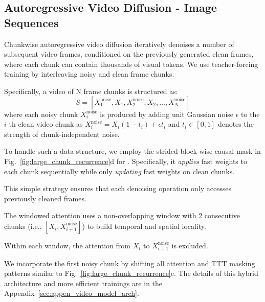 \documentclass{article}
\begin{document}
\subsection{Autoregressive Video Diffusion - Image Sequences}

\label{sec:method-arvideo}

Chunkwise autoregressive video diffusion iteratively denoises a number of subsequent video frames, conditioned on the previously generated clean frames, where each chunk can contain thousands of visual tokens. 
We use teacher-forcing training by interleaving noisy and clean frame chunks.

Specifically, a video of N frame chunks is structured as:
\begin{equation}
    S = [X_1^{\text{noise}}, X_1, X_2^{\text{noise}}, X_2, \ldots, X_N^{\text{noise}}]
    \label{eq:video_sequence_basic}
\end{equation}
where each noisy chunk $X_i^{\text{noise}}$ is produced by adding unit Gaussian noise $\epsilon$ to the $i$-th clean video chunk as $X_i^{\text{noise}} = X_i (1 - t_i) + \epsilon t_i$ and $t_i \in [0, 1]$ denotes the strength of chunk-independent noise. 

To handle such a data structure, we employ the strided block-wise causal mask in Fig.~\ref{fig:large_chunk_recurrence}d for  \methodname{}.
Specifically, it \textit{applies} fast weights to each chunk sequentially while only \textit{updating} fast weights on clean chunks.

This simple strategy ensures that each denoising operation only accesses previously cleaned frames. 

The windowed attention uses a non-overlapping window with 2 consecutive chunks (i.e., $[X_i, X_{i+1}^\text{noise}]$) to build temporal and spatial locality.

Within each window, the attention from $X_i$ to  $X_{i+1}^\text{noise}$ is excluded.

We incorporate the first noisy chunk by shifting all attention and TTT masking patterns similar to Fig.~\ref{fig:large_chunk_recurrence}c.
The details of this hybrid architecture and more efficient trainings are in the Appendix~\ref{sec:appen_video_model_arch}.

    

        

        

        

        

        
\end{document}
